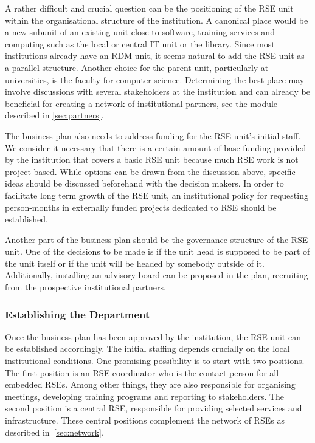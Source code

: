 \documentclass[a4paper]{article}
\begin{document}
A rather difficult and crucial question can be the positioning of the RSE unit within the organisational structure of the institution.
A canonical place would be a new subunit of an existing unit close to software,
training services and computing such as the local or central IT unit or the library.
Since most institutions already have an RDM unit, it seems natural to add the RSE unit as a parallel structure.
Another choice for the parent unit, particularly at universities, is the faculty for computer science.
Determining the best place may involve discussions with several stakeholders at the institution and can already be beneficial for creating a
network of institutional partners, see the module described in \autoref{sec:partners}.

The business plan also needs to address funding for the RSE unit's initial staff.
We consider it necessary that there is a certain amount of base funding provided by the institution that covers a basic RSE unit because much RSE work is not project based.
While options can be drawn from the discussion above, specific ideas should be discussed beforehand with the decision makers.
In order to facilitate long term growth of the RSE unit, an institutional policy for requesting person-months in externally funded projects dedicated to RSE should be established.

Another part of the business plan should be the governance structure of the RSE unit.
One of the decisions to be made is if the unit head is supposed to be part of the unit itself or if the unit will be headed by somebody outside of it.
Additionally, installing an advisory board can be proposed in the plan, recruiting from the prospective institutional partners.

\subsubsection{Establishing the Department}
Once the business plan has been approved by the institution, the RSE unit can be established accordingly.
The initial staffing depends crucially on the local institutional conditions.
One promising possibility is to start with two positions.
The first position is an RSE coordinator who is the contact person for all embedded RSEs.
Among other things, they are also responsible for organising meetings, developing training programs and reporting to stakeholders.
The second position is a central RSE, responsible for providing selected services and infrastructure.
These central positions complement the network of RSEs as described in~\autoref{sec:network}.
\end{document}

